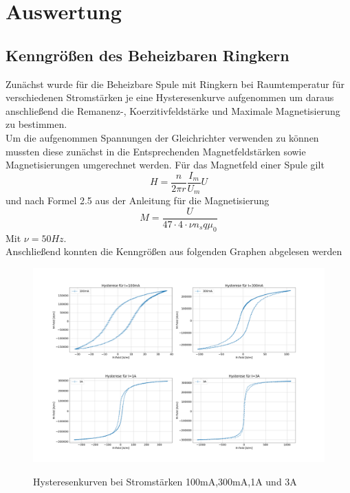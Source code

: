 \section{Auswertung}
    \subsection{Kenngrößen des Beheizbaren Ringkern}
        Zunächst wurde für die Beheizbare Spule mit Ringkern bei Raumtemperatur für verschiedenen Stromstärken je eine Hysteresenkurve
        aufgenommen um daraus anschließend die Remanenz-, Koerzitivfeldstärke und Maximale Magnetisierung zu bestimmen.\\
        Um die aufgenommen Spannungen der Gleichrichter verwenden zu können mussten diese zunächst in die Entsprechenden Magnetfeldstärken sowie Magnetisierungen umgerechnet werden.
        Für das Magnetfeld einer Spule gilt
        \begin{equation}
            H = \frac{n}{2\pi r}\frac{I_m}{U_m}U
        \end{equation}
        und nach Formel 2.5 aus der Anleitung für die Magnetisierung
        \begin{equation}
            M = \frac{U}{47\cdot 4\cdot \nu n_s q \mu_0}
        \end{equation}
        Mit $\nu = 50Hz$.\\
        Anschließend konnten die Kenngrößen aus folgenden Graphen abgelesen werden
        \begin{figure}[H]
            \centering
            \includegraphics[width=\textwidth]{Images/Teil1.PNG}
            \label{Hysteresen}
            \caption{Hysteresenkurven bei Stromstärken 100mA,300mA,1A und 3A}
        \end{figure}
